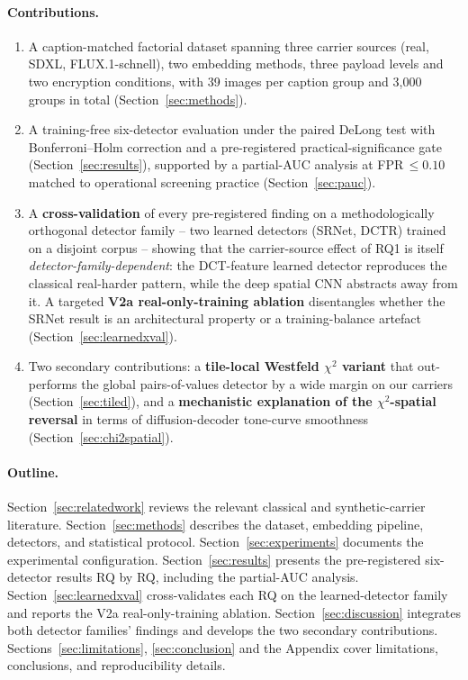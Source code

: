 \documentclass[10pt,twocolumn,a4paper]{article}
\begin{document}
\paragraph{Contributions.}
\begin{enumerate}
\item A caption-matched factorial dataset spanning three carrier sources (real, SDXL, FLUX.1-schnell), two embedding methods, three payload levels and two encryption conditions, with 39 images per caption group and 3{,}000 groups in total (Section~\ref{sec:methods}).
\item A training-free six-detector evaluation under the paired DeLong test with Bonferroni--Holm correction and a pre-registered practical-significance gate (Section~\ref{sec:results}), supported by a partial-AUC analysis at FPR\,$\leq\!0.10$ matched to operational screening practice (Section~\ref{sec:pauc}).
\item A \textbf{cross-validation} of every pre-registered finding on a methodologically orthogonal detector family -- two learned detectors (SRNet, DCTR) trained on a disjoint corpus -- showing that the carrier-source effect of RQ1 is itself \emph{detector-family-dependent}: the DCT-feature learned detector reproduces the classical real-harder pattern, while the deep spatial CNN abstracts away from it. A targeted \textbf{V2a real-only-training ablation} disentangles whether the SRNet result is an architectural property or a training-balance artefact (Section~\ref{sec:learnedxval}).
\item Two secondary contributions: a \textbf{tile-local Westfeld $\chi^2$ variant} that out-performs the global pairs-of-values detector by a wide margin on our carriers (Section~\ref{sec:tiled}), and a \textbf{mechanistic explanation of the $\chi^2$-spatial reversal} in terms of diffusion-decoder tone-curve smoothness (Section~\ref{sec:chi2spatial}).
\end{enumerate}

\paragraph{Outline.} Section~\ref{sec:relatedwork} reviews the relevant classical and synthetic-carrier literature. Section~\ref{sec:methods} describes the dataset, embedding pipeline, detectors, and statistical protocol. Section~\ref{sec:experiments} documents the experimental configuration. Section~\ref{sec:results} presents the pre-registered six-detector results RQ by RQ, including the partial-AUC analysis. Section~\ref{sec:learnedxval} cross-validates each RQ on the learned-detector family and reports the V2a real-only-training ablation. Section~\ref{sec:discussion} integrates both detector families' findings and develops the two secondary contributions. Sections~\ref{sec:limitations}, \ref{sec:conclusion} and the Appendix cover limitations, conclusions, and reproducibility details.
\end{document}
